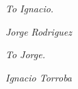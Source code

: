 \null\vfill

\begin{flushright}
\emph{To Ignacio.}

\vspace{5mm}

\emph{Jorge Rodriguez}

\vspace{2cm}
\vspace{2cm}

\emph{To Jorge.}

\vspace{5mm}

\emph{Ignacio Torroba}

\end{flushright}
\null\vfill